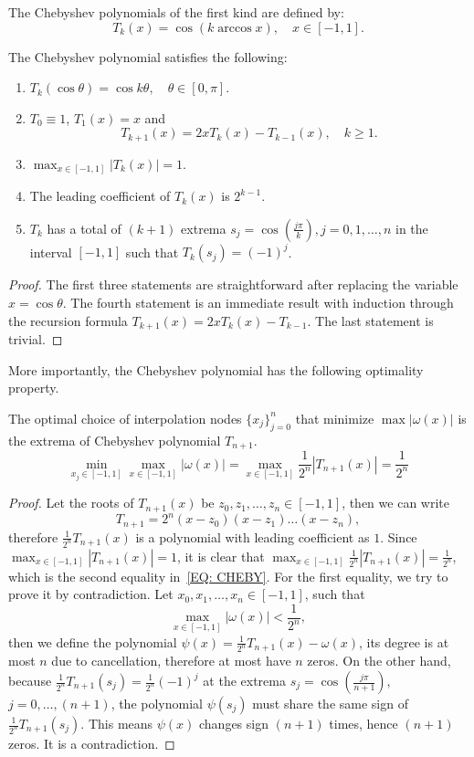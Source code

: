 \begin{definition}
    The Chebyshev polynomials of the first kind are defined by: 
    $$T_k(x) = \cos (k\arccos x),\quad x\in[-1,1].$$
\end{definition}
\begin{theorem}
\label{Thm: 2-Che-Pro}
    The Chebyshev polynomial satisfies the following: 
    \begin{enumerate}
        \item $T_k(\cos\theta) = \cos k\theta, \quad \theta\in [0, \pi]$.
        \item $T_0 \equiv 1$, $T_1(x) = x$ and 
        $$T_{k+1}(x) = 2 x T_{k}(x) - T_{k-1}(x), \quad k\ge 1.$$
        \item $\max_{x\in[-1,1]} |T_k(x)| = 1$.
        \item The leading coefficient of $T_k(x)$ is $2^{k-1}$.
        \item $T_k$ has a total of $(k+1)$ extrema $s_j = \cos(\frac{j\pi}{k}), j = 0, 1,\dots, n$ in the interval $[-1,1]$ such that $T_k(s_j) = (-1)^j$.
    \end{enumerate}
\end{theorem}
\begin{proof}
    The first three statements are straightforward after replacing the variable $x = \cos\theta$. The fourth statement is an immediate result with induction through the recursion formula 
    $T_{k+1}(x) = 2 x T_k(x) - T_{k-1}$. The last statement is trivial.
\end{proof}
More importantly, the Chebyshev polynomial has the following optimality property. 
\begin{theorem}
\label{Thm: 2-Che-opt}
    The optimal choice of interpolation nodes $\{x_j\}_{j=0}^{n}$ that minimize $\max |\omega(x)|$ is the extrema of Chebyshev polynomial $T_{{n+1}}$.
    \begin{equation}\label{EQ: CHEBY}
        \min_{x_j\in[-1,1]} \max_{x\in[-1,1]} |\omega(x)| =   \max_{x\in[-1,1]} \frac{1}{2^n}|T_{n+1}(x)|  = \frac{1}{2^n}
    \end{equation}
\end{theorem}
\begin{proof}
    Let the roots of $T_{n+1}(x)$ be $z_0, z_1, \dots, z_{n}\in [-1, 1]$, then we can write 
    $$T_{n+1} = 2^{n}(x - z_0)(x-z_1)\dots (x - z_{n}),$$
    therefore $\frac{1}{2^n} T_{n+1}(x)$ is a polynomial with leading coefficient as $1$. Since $\max_{x\in[-1,1]} |T_{n+1}(x)| = 1$, it is clear that $\max_{x\in [-1,1]} \frac{1}{2^n}|T_{n+1}(x)| = \frac{1}{2^n}$, which is the second equality in~\eqref{EQ: CHEBY}. For the first equality, we try to prove it by contradiction. Let $x_0, x_1, \dots, x_n\in [-1, 1]$, such that 
    $$\max_{x\in[-1,1]}|\omega(x)| < \frac{1}{2^n},$$
    then we define the polynomial $\psi(x) = \frac{1}{2^n}T_{n+1}(x)- \omega(x)$, its degree is at most $n$ due to cancellation, therefore at most have $n$ zeros. On the other hand, because $\frac{1}{2^n}T_{n+1}(s_j) = \frac{1}{2^n}(-1)^j$ at the extrema $s_j = \cos(\frac{j\pi}{n+1})$, $j=0,\dots, (n+1)$, the polynomial $\psi(s_j)$ must share the same sign of $\frac{1}{2^n}T_{n+1}(s_j)$. This means $\psi(x)$ changes sign $(n+1)$ times, hence $(n+1)$ zeros. It is a contradiction.
\end{proof}
